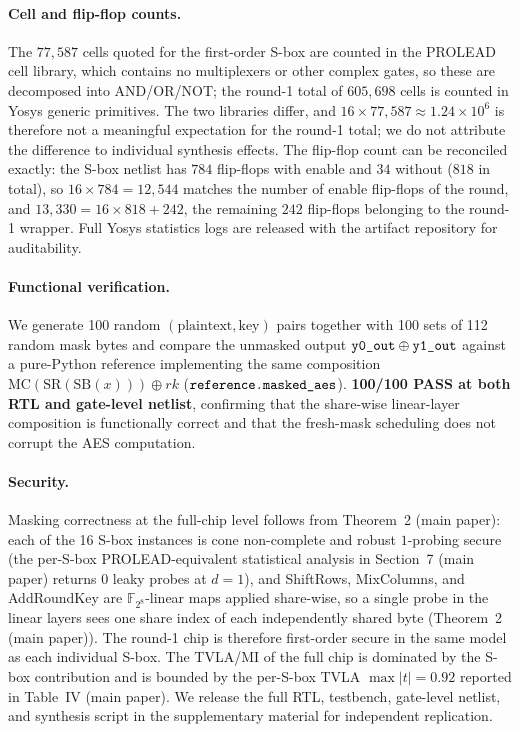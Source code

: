 \documentclass[journal,onecolumn]{IEEEtran}
\begin{document}
\paragraph{Cell and flip-flop counts.} The $77{,}587$ cells quoted for the
first-order S-box are counted in the PROLEAD cell library, which contains no
multiplexers or other complex gates, so these are decomposed into AND/OR/NOT;
the round-1 total of $605{,}698$ cells is counted in Yosys generic primitives.
The two libraries differ, and $16\times 77{,}587\approx 1.24\times 10^{6}$ is
therefore not a meaningful expectation for the round-1 total; we do not
attribute the difference to individual synthesis effects. The flip-flop count
can be reconciled exactly: the S-box netlist has $784$ flip-flops with enable
and $34$ without ($818$ in total), so $16\times 784=12{,}544$ matches the
number of enable flip-flops of the round, and
$13{,}330 = 16\times 818 + 242$, the remaining $242$ flip-flops belonging to
the round-1 wrapper. Full Yosys statistics logs are released with the
artifact repository for auditability.

\paragraph{Functional verification.}
We generate 100 random $(\text{plaintext}, \text{key})$ pairs
together with 100 sets of 112 random mask bytes and compare the
unmasked output $\texttt{y0\_\allowbreak{}out} \oplus \texttt{y1\_\allowbreak{}out}$ against
a pure-Python reference implementing the same composition
$\mathrm{MC}(\mathrm{SR}(\mathrm{SB}(x))) \oplus \mathit{rk}$
($\texttt{reference.masked\_\allowbreak{}aes}$).  \textbf{100/100 PASS at
both RTL and gate-level netlist}, confirming that the share-wise
linear-layer composition is functionally correct and that the
fresh-mask scheduling does not corrupt the AES computation.

\paragraph{Security.}
Masking correctness at the full-chip level follows from
Theorem~2 (main paper): each of the 16 S-box instances is
cone non-complete and robust $1$-probing secure (the per-S-box
PROLEAD-equivalent statistical analysis in
Section~7 (main paper) returns 0 leaky probes at $d{=}1$), and
ShiftRows, MixColumns, and AddRoundKey are $\mathbb{F}_{2^8}$-linear
maps applied share-wise, so a single probe in the linear layers sees one share index of each
independently shared byte (Theorem~2 (main paper)).  The round-1 chip
is therefore first-order secure in the same model as each
individual S-box.  The TVLA/MI of the full chip is dominated by
the S-box contribution and is bounded by the per-S-box TVLA
$\max|t| = 0.92$ reported in Table~IV (main paper).  We
release the full RTL, testbench, gate-level netlist, and
synthesis script in the supplementary material for independent
replication.
\end{document}
